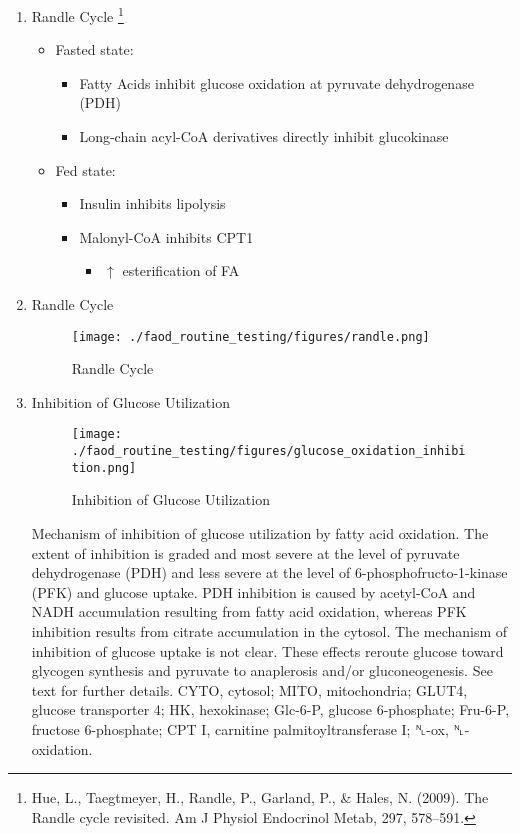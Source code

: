 \documentclass{scrartcl}
\begin{document}
\begin{enumerate}
\item Randle Cycle \footnote{Hue, L., Taegtmeyer, H., Randle, P., Garland, P., \& Hales,
N. (2009). The Randle cycle revisited. Am J Physiol Endocrinol Metab,
297, 578–591.}
\label{sec:org41fcdcd}
\begin{itemize}
\item Fasted state:
\begin{itemize}
\item Fatty Acids inhibit glucose oxidation at pyruvate dehydrogenase
(PDH)
\item Long-chain acyl-CoA derivatives directly inhibit glucokinase
\end{itemize}
\item Fed state:
\begin{itemize}
\item Insulin inhibits lipolysis
\item Malonyl-CoA inhibits CPT1
\begin{itemize}
\item \(\uparrow\) esterification of FA
\end{itemize}
\end{itemize}
\end{itemize}

\item Randle Cycle
\label{sec:org1253947}
\begin{figure}[htbp]
\centering
\texttt{[image: ./faod\_routine\_testing/figures/randle.png]}
\caption{\label{fig:orgc995876}
Randle Cycle}
\end{figure}

\item Inhibition of Glucose Utilization
\label{sec:org4067980}
\begin{figure}[htbp]
\centering
\texttt{[image: ./faod\_routine\_testing/figures/glucose\_oxidation\_inhibition.png]}
\caption{\label{fig:org2275991}
Inhibition of Glucose Utilization}
\end{figure}

Mechanism of inhibition of glucose utilization by fatty acid
oxidation. The extent of inhibition is graded and most severe at the
level of pyruvate dehydrogenase (PDH) and less severe at the level of
6-phosphofructo-1-kinase (PFK) and glucose uptake. PDH inhibition is
caused by acetyl-CoA and NADH accumulation resulting from fatty acid
oxidation, whereas PFK inhibition results from citrate accumulation
in the cytosol. The mechanism of inhibition of glucose uptake is not
clear. These effects reroute glucose toward glycogen synthesis and
pyruvate to anaplerosis and/or gluconeogenesis. See text for further
details. CYTO, cytosol; MITO, mitochondria; GLUT4, glucose transporter
4; HK, hexokinase; Glc-6-P, glucose 6-phosphate; Fru-6-P, fructose
6-phosphate; CPT I, carnitine palmitoyltransferase I; ␤-ox,
␤-oxidation.


\end{enumerate}
\end{document}
